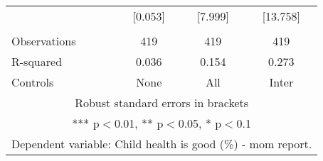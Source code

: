 \begin{tabular}{lccc}
 & [0.053] & [7.999] & [13.758] \\
 &  &  &  \\
Observations & 419 & 419 & 419 \\
R-squared & 0.036 & 0.154 & 0.273 \\
 Controls & None & All & Inter \\ \hline
\multicolumn{4}{c}{ Robust standard errors in brackets} \\
\multicolumn{4}{c}{ *** p$<$0.01, ** p$<$0.05, * p$<$0.1} \\
\multicolumn{4}{c}{ Dependent variable: Child health is good (\%) - mom report.} \\
\end{tabular}
